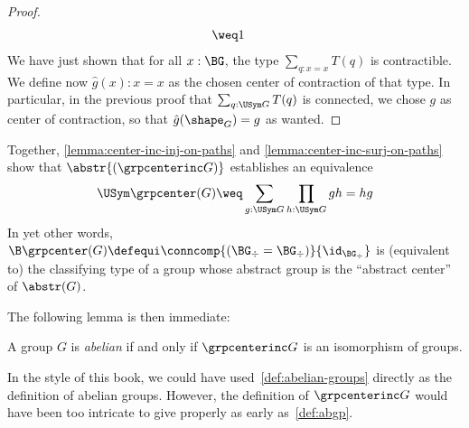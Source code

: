 \begin{proof}
\begin{displaymath}
\begin{aligned}
      &\weq 1
    \end{aligned}
  \end{displaymath}%
  We have just shown that for all $x:\BG$, the type
  $\sum_{q:x=x}T(q)$ is contractible. We define now $\hat g(x):x=x$ as
  the chosen center of contraction of that type. In particular, in the
  previous proof that $\sum_{q:\USym G}T(q)$ is connected, we
  chose $g$ as center of contraction, so that $\hat g (\shape_G) = g$ as
  wanted.
\end{proof}

Together, \cref{lemma:center-inc-inj-on-paths} and
\cref{lemma:center-inc-surj-on-paths} show that
$\abstr{(\grpcenterinc G)}$ establishes an equivalence
\begin{equation}
  \USym \grpcenter(G) \weq \sum_{g:\USym G}\prod_{h:\USym G}gh=hg
\end{equation}
In yet other words,
$\B \grpcenter(G)\defequi \conncomp{(\BG_\div = \BG_\div)}
{\id_{\BG_\div}}$ is (equivalent to) the classifying type of a
group whose abstract group is the ``abstract center'' of $\abstr(G)$.

The following lemma is then immediate:
\begin{lemma}
  \label{def:abelian-groups}%
  A group $G$ is {\em abelian} if and only if $\grpcenterinc G$ is an
  isomorphism of groups.
\end{lemma}

\begin{remark}
  In the style of this book, we could have
  used~\cref{def:abelian-groups} directly as the definition of abelian
  groups. However, the definition of $\grpcenterinc G$ would have been
  too intricate to give properly as early as~\cref{def:abgp}.
\end{remark}

